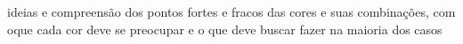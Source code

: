 ideias e compreensão dos pontos fortes e fracos das cores e suas combinações, com oque cada cor deve se preocupar e o que deve buscar fazer na maioria dos casos